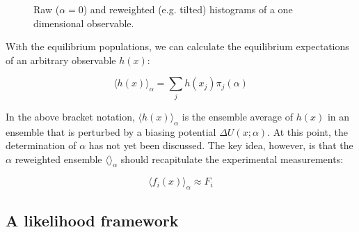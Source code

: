 \documentclass[journal=jacsat,manuscript=article]{achemso}
\begin{document}
\begin{figure}

\caption{
Raw ($\alpha = 0$) and reweighted (e.g. tilted) histograms of a one dimensional observable.
}
\label{figure:Hist}
\end{figure}

With the equilibrium populations, we can calculate the equilibrium expectations of an arbitrary observable $h(x)$:

$$\langle h(x)\rangle _\alpha = \sum_j h(x_j) \pi_j(\alpha)$$

In the above bracket notation, $\langle h(x)\rangle _\alpha$ is the ensemble average of $h(x)$ in an ensemble that is perturbed by a biasing potential $\Delta U(x;\alpha)$.  At this point, the determination of $\alpha$ has not yet been discussed.  The key idea, however, is that the $\alpha$ reweighted ensemble $\langle \rangle _\alpha$ should recapitulate the experimental measurements:

$$\langle f_i(x)\rangle _\alpha \approx F_i$$


\subsection{A likelihood framework}
\end{document}
